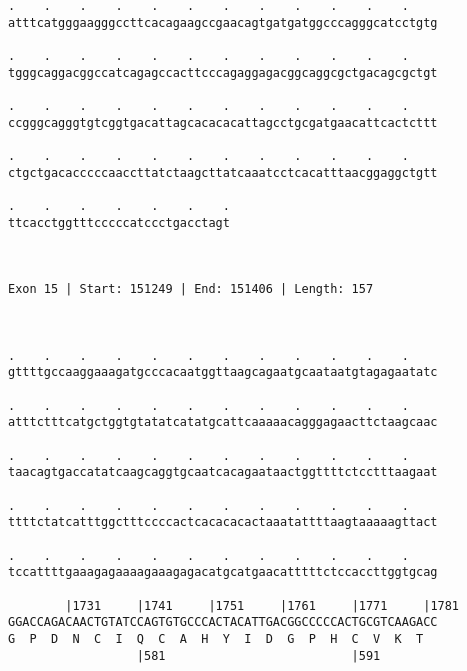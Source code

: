 \documentclass{article}
\begin{document}
\begin{Verbatim}
.    .    .    .    .    .    .    .    .    .    .    .    
atttcatgggaagggccttcacagaagccgaacagtgatgatggcccagggcatcctgtg
                                                            
.    .    .    .    .    .    .    .    .    .    .    .    
tgggcaggacggccatcagagccacttcccagaggagacggcaggcgctgacagcgctgt
                                                            
.    .    .    .    .    .    .    .    .    .    .    .    
ccgggcagggtgtcggtgacattagcacacacattagcctgcgatgaacattcactcttt
                                                            
.    .    .    .    .    .    .    .    .    .    .    .    
ctgctgacacccccaaccttatctaagcttatcaaatcctcacatttaacggaggctgtt
                                                            
.    .    .    .    .    .    .
ttcacctggtttcccccatccctgacctagt
                               
                               
 
Exon 15 | Start: 151249 | End: 151406 | Length: 157



.    .    .    .    .    .    .    .    .    .    .    .    
gttttgccaaggaaagatgcccacaatggttaagcagaatgcaataatgtagagaatatc
                                                            
.    .    .    .    .    .    .    .    .    .    .    .    
atttctttcatgctggtgtatatcatatgcattcaaaaacagggagaacttctaagcaac
                                                            
.    .    .    .    .    .    .    .    .    .    .    .    
taacagtgaccatatcaagcaggtgcaatcacagaataactggttttctcctttaagaat
                                                            
.    .    .    .    .    .    .    .    .    .    .    .    
ttttctatcatttggctttccccactcacacacactaaatattttaagtaaaaagttact
                                                            
.    .    .    .    .    .    .    .    .    .    .    .    
tccattttgaaagagaaaagaaagagacatgcatgaacatttttctccaccttggtgcag
                                                            
        |1731     |1741     |1751     |1761     |1771     |1781
GGACCAGACAACTGTATCCAGTGTGCCCACTACATTGACGGCCCCCACTGCGTCAAGACC
G  P  D  N  C  I  Q  C  A  H  Y  I  D  G  P  H  C  V  K  T  
                  |581                          |591        
  

\end{Verbatim}
\end{document}
